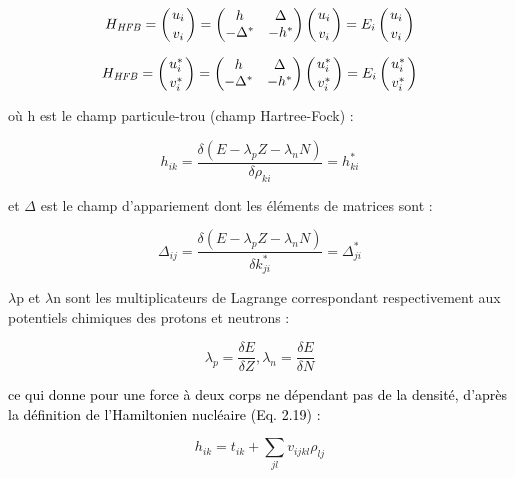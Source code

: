  \begin{equation} H_{\mathit{HFB}}=\left(\genfrac{}{}{0pt}{0}{u_i}{v_i}\right)=\left(\begin{matrix}h&{\Delta}\\-{\Delta}^{\ast
}&-h^{\ast
}\end{matrix}\right)\left(\genfrac{}{}{0pt}{0}{u_i}{v_i}\right)=E_i\left(\genfrac{}{}{0pt}{0}{u_i}{v_i}\right)\end{equation}

 \begin{equation}H_{\mathit{HFB}}=\left(\genfrac{}{}{0pt}{0}{u_i^{\ast }}{v_i^{\ast
}}\right)=\left(\begin{matrix}h&{\Delta}\\-{\Delta}^{\ast }&-h^{\ast
}\end{matrix}\right)\left(\genfrac{}{}{0pt}{0}{u_i^{\ast }}{v_i^{\ast }}\right)=E_i\left(\genfrac{}{}{0pt}{0}{u_i^{\ast
}}{v_i^{\ast }}\right)
\end{equation}

où h est le champ particule-trou (champ Hartree-Fock) :

 \begin{equation}h_{\mathit{ik}}=\frac{\delta (E-\lambda _pZ-\lambda _nN)}{\delta \rho _{\mathit{ki}}}=h_{\mathit{ki}}^{\ast
}\end{equation}

et $\Delta $ est le champ d'appariement dont les éléments de matrices sont :


 \begin{equation}{\Delta}_{\mathit{ij}}=\frac{\delta (E-\lambda _pZ-\lambda _nN)}{\delta k_{\mathit{ji}}^{\ast
}}={\Delta}_{\mathit{ji}}^{\ast }
\end{equation}

$\lambda $p et $\lambda $n sont les multiplicateurs de Lagrange correspondant respectivement aux
potentiels chimiques des protons et neutrons :

 \begin{equation}
\lambda _p=\frac{\mathit{\delta E}}{\mathit{\delta Z}}, \lambda _n=\frac{\mathit{\delta E}}{\mathit{\delta N}}
\end{equation}

\textcolor{black}{ce qui donne pour une force à deux corps ne dépendant pas de la densité, d'après la définition}
\textcolor{black}{de l'Hamiltonien nucléaire (Eq. 2.19) :}

 \begin{equation}h_{\mathit{ik}}=t_{\mathit{ik}}+\sum _{\mathit{jl}}v_{\mathit{ijkl}}\rho
_{\mathit{lj}}
\end{equation}

